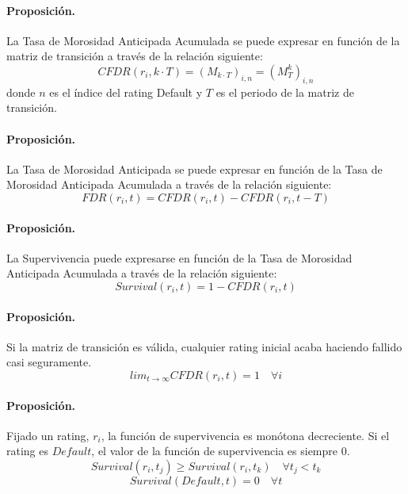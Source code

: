 \paragraph{Proposici\'on.} La Tasa de Morosidad Anticipada Acumulada se 
puede expresar en funci\'on de la matriz de transici\'on a trav\'es de la
relaci\'on siguiente:
\begin{equation}
CFDR(r_i,k \cdot T) = (M_{k \cdot T})_{i,n} = (M_{T}^{k})_{i,n}
\label{eq:cdfr1}
\end{equation}
donde $n$ es el \'indice del rating Default y $T$ es el periodo de la matriz
de transici\'on.

\paragraph{Proposici\'on.} La Tasa de Morosidad Anticipada se puede expresar 
en funci\'on de la Tasa de Morosidad Anticipada Acumulada a trav\'es de la
relaci\'on siguiente:
\begin{equation}
FDR(r_i, t) =  CFDR(r_i, t) - CFDR(r_i, t-T)
\end{equation}

\paragraph{Proposici\'on.} La Supervivencia puede expresarse en funci\'on de
la Tasa de Morosidad Anticipada Acumulada a trav\'es de la relaci\'on siguiente:
\begin{equation}
Survival(r_i, t) =  1 - CFDR(r_i, t)
\label{eq:survival1}
\end{equation}

\paragraph{Proposici\'on.} Si la matriz de transici\'on es v\'alida, cualquier 
rating inicial acaba haciendo fallido casi seguramente.
\begin{equation}
lim_{t \to \infty} CFDR(r_i, t) =  1 \quad \forall i
\end{equation}

\paragraph{Proposici\'on.} Fijado un rating, $r_i$, la funci\'on de 
supervivencia es mon\'otona decreciente. Si el rating es $Default$,
el valor de la funci\'on de supervivencia es siempre $0$.
\begin{equation}
\label{prop:survival1}
Survival(r_i, t_j) \ge Survival(r_i, t_k) \quad \forall t_j < t_k
\end{equation}
\begin{equation}
\label{prop:survival2}
Survival(Default, t) = 0 \quad \forall t
\end{equation}


